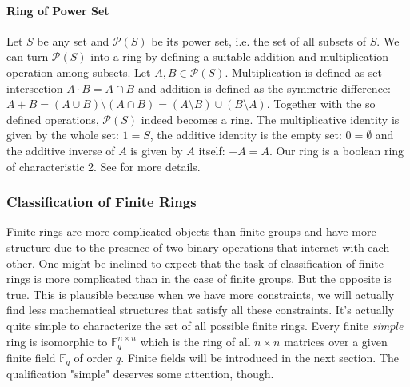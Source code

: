 
\paragraph{Ring of Power Set} Let $S$ be any set and $\mathcal{P}(S)$ be its power set, i.e. the set of all subsets of $S$. We can turn $\mathcal{P}(S)$ into a ring by defining a suitable addition and multiplication operation among subsets. Let $A, B \in \mathcal{P}(S)$. Multiplication is defined as set intersection $A \cdot B = A \cap B$ and addition is defined as the symmetric difference: $A + B = (A \cup B) \setminus (A \cap B) = (A \setminus B) \cup (B \setminus A)$. Together with the so defined operations, $\mathcal{P}(S)$ indeed becomes a ring. The multiplicative identity is given by the whole set: $1 = S$, the additive identity is the empty set: $0 = \emptyset$ and the additive inverse of $A$ is given by $A$ itself: $-A = A$. Our ring is a boolean ring of characteristic 2. See \cite{YT_PowerSetRing} for more details.



\subsubsection{Classification of Finite Rings}
Finite rings are more complicated objects than finite groups and have more structure due to the presence of two binary operations that interact with each other. One might be inclined to expect that the task of classification of finite rings is more complicated than in the case of finite groups. But the opposite is true. This is plausible because when we have more constraints, we will actually find less mathematical structures that satisfy all these constraints. It's actually quite simple to characterize the set of all possible finite rings. Every finite \emph{simple} ring is isomorphic to $\mathbb{F}_q^{n \times n}$ which is the ring of all $n \times n$ matrices over a given finite field $\mathbb{F}_q$ of order $q$. Finite fields will be introduced in the next section. The qualification "simple" deserves some attention, though.

